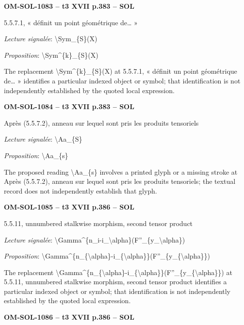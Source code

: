 \par\noindent\textbf{OM-SOL-1083 -- t3 XVII p.383 -- SOL}\par
5.5.7.1, « définit un point géométrique de… »\par
\emph{Lecture signalée}: \textbackslash{}Sym\_\{S\}(X)\par
\emph{Proposition}: \textbackslash{}Sym\textasciicircum{}\{k\}\_\{S\}(X)\par
The replacement \textbackslash{}Sym\textasciicircum{}\{k\}\_\{S\}(X) at 5.5.7.1, « définit un point géométrique de… » identifies a particular indexed object or symbol; that identification is not independently established by the quoted local expression.\par
\par\noindent\textbf{OM-SOL-1084 -- t3 XVII p.383 -- SOL}\par
Après (5.5.7.2), anneau sur lequel sont pris les produits tensoriels\par
\emph{Lecture signalée}: \textbackslash{}Aa\_\{S\}\par
\emph{Proposition}: \textbackslash{}Aa\_\{s\}\par
The proposed reading \textbackslash{}Aa\_\{s\} involves a printed glyph or a missing stroke at Après (5.5.7.2), anneau sur lequel sont pris les produits tensoriels; the textual record does not independently establish that glyph.\par
\par\noindent\textbf{OM-SOL-1085 -- t3 XVII p.386 -- SOL}\par
5.5.11, unnumbered stalkwise morphism, second tensor product\par
\emph{Lecture signalée}: \textbackslash{}Gamma\textasciicircum{}\{n\_i-i\_\textbackslash{}alpha\}(F''\_\{y\_\textbackslash{}alpha\})\par
\emph{Proposition}: \textbackslash{}Gamma\textasciicircum{}\{n\_\{\textbackslash{}alpha\}-i\_\{\textbackslash{}alpha\}\}(F''\_\{y\_\{\textbackslash{}alpha\}\})\par
The replacement \textbackslash{}Gamma\textasciicircum{}\{n\_\{\textbackslash{}alpha\}-i\_\{\textbackslash{}alpha\}\}(F''\_\{y\_\{\textbackslash{}alpha\}\}) at 5.5.11, unnumbered stalkwise morphism, second tensor product identifies a particular indexed object or symbol; that identification is not independently established by the quoted local expression.\par
\par\noindent\textbf{OM-SOL-1086 -- t3 XVII p.386 -- SOL}\par

